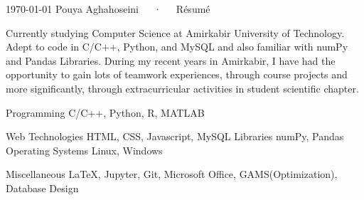\documentclass[11pt, a4paper]{awesome-cv}
\begin{document}
\makecvheader[C]

\makecvfooter
  {\today}
  {Pouya Aghahoseini~~~·~~~Résumé}
  {\thepage}


\begin{cvparagraph}
	
	Currently studying Computer Science at Amirkabir University of Technology. Adept to code in C/C++, Python, and MySQL and also familiar with numPy and Pandas Libraries.
	During my recent years in Amirkabir, I have had the opportunity to gain lots of teamwork experiences, through course projects and more significantly, through extracurricular activities in student scientific chapter.
	
\end{cvparagraph}


\begin{cvskills}
	\cvskill
	{Programming} %
	{C/C++, Python, R, MATLAB} %
	
	\cvskill
	{Web Technologies} %
	{HTML, CSS, Javascript, MySQL} %
	\cvskill
	{Libraries} %
	{numPy, Pandas} %
	\cvskill
	{Operating Systems} %
	{Linux, Windows}
	
	\cvskill
	{Miscellaneous}
	{\LaTeX, Jupyter, Git, Microsoft Office, GAMS(Optimization), Database Design}%
	
\end{cvskills}
\end{document}
